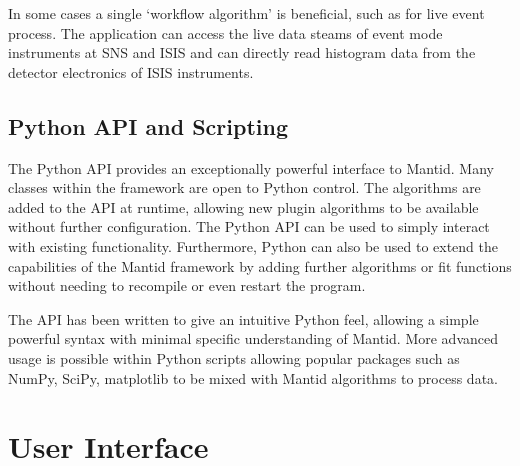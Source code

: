 \documentclass[1p]{elsarticle}
\begin{document}
In some cases a single `workflow algorithm' is beneficial, such as for live event process. The application can access the live data steams of event mode instruments at SNS and ISIS and can directly read histogram data from the detector electronics of ISIS instruments.

\subsection{Python API and Scripting}
The Python API provides an exceptionally powerful interface to Mantid. Many classes within the framework are open to Python control. The algorithms are added to the API at runtime, allowing new plugin algorithms to be available without further configuration. The Python API can be used to simply interact with existing functionality. Furthermore, Python can also be used to extend the capabilities of the Mantid framework by adding further algorithms or fit functions without needing to recompile or even restart the program.

The API has been written to give an intuitive Python feel, allowing a simple powerful syntax with minimal specific understanding of Mantid.  More advanced usage is possible within Python scripts allowing popular packages such as NumPy, SciPy, matplotlib \cite{numpy,scipy, matplotlib} to be mixed with Mantid algorithms to process data.  



\section{User Interface}
\end{document}
